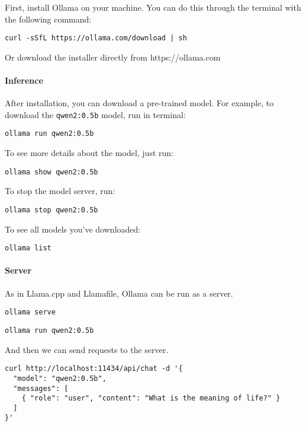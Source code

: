First, install Ollama on your machine. You can do this through the terminal with the following command:

\begin{verbatim}
curl -sSfL https://ollama.com/download | sh
\end{verbatim}

Or download the installer directly from https://ollama.com

\paragraph{Inference}

After installation, you can download a pre-trained model. For example, to download the \texttt{qwen2:0.5b} model, run in terminal:

\begin{verbatim}
ollama run qwen2:0.5b
\end{verbatim}

To see more details about the model, just run:

\begin{verbatim}
ollama show qwen2:0.5b
\end{verbatim}

To stop the model server, run:

\begin{verbatim}
ollama stop qwen2:0.5b
\end{verbatim}

To see all models you've downloaded:

\begin{verbatim}
ollama list
\end{verbatim}

\paragraph{Server}

As in Llama.cpp and Llamafile, Ollama can be run as a server.

\begin{verbatim}
ollama serve
\end{verbatim}

\begin{verbatim}
ollama run qwen2:0.5b
\end{verbatim}

And then we can send requests to the server.

\begin{verbatim}
curl http://localhost:11434/api/chat -d '{
  "model": "qwen2:0.5b",
  "messages": [
    { "role": "user", "content": "What is the meaning of life?" }
  ]
}'
\end{verbatim}

